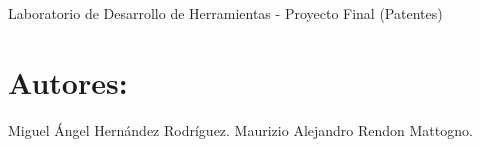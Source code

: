 Laboratorio de Desarrollo de Herramientas -\/ Proyecto Final (Patentes)

\section*{Autores\-: }

\begin{DoxyVerb}Miguel Ángel Hernández Rodríguez.
Maurizio Alejandro Rendon Mattogno.\end{DoxyVerb}
 